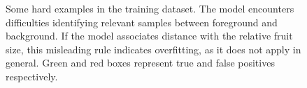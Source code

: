  \begin{figure}[!ht]
  \centering
  \caption{Some hard examples in the training dataset. The model encounters difficulties identifying relevant samples between foreground and background. If the model associates distance with the relative fruit size, this misleading rule indicates overfitting, as it does not apply in general. Green and red boxes represent true and false positives respectively.}
  \label{fig3}
\end{figure}

